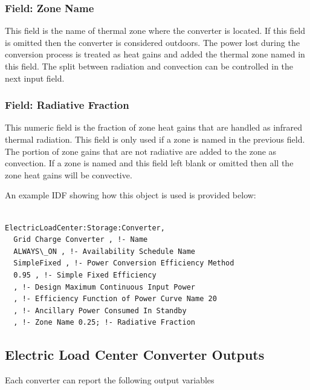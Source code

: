 \subsubsection{Field: Zone Name}\label{field-zone-name-4-000}

This field is the name of thermal zone where the converter is located. If this field is omitted then the converter is considered outdoors. The power lost during the conversion process is treated as heat gains and added the thermal zone named in this field. The split between radiation and convection can be controlled in the next input field.

\subsubsection{Field: Radiative Fraction}\label{field-zone-rad-fract}

This numeric field is the fraction of zone heat gains that are handled as infrared thermal radiation. This field is only used if a zone is named in the previous field. The portion of zone gains that are not radiative are added to the zone as convection. If a zone is named and this field left blank or omitted then all the zone heat gains will be convective.

An example IDF showing how this object is used is provided below:

\begin{lstlisting}

ElectricLoadCenter:Storage:Converter,
  Grid Charge Converter , !- Name
  ALWAYS\_ON , !- Availability Schedule Name
  SimpleFixed , !- Power Conversion Efficiency Method
  0.95 , !- Simple Fixed Efficiency
  , !- Design Maximum Continuous Input Power
  , !- Efficiency Function of Power Curve Name 20
  , !- Ancillary Power Consumed In Standby
  , !- Zone Name 0.25; !- Radiative Fraction
\end{lstlisting}

\subsection{Electric Load Center Converter Outputs}\label{electric-load-center-converter-outputs}

Each converter can report the following output variables


